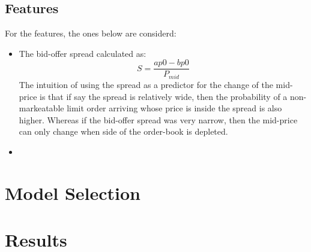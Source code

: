 \documentclass[english, 11pt, a4paper]{article}
\begin{document}
\subsection{Features}
For the features, the ones below are considerd:
\begin{itemize}
    \item The bid-offer spread calculated as:
        \begin{equation}
            S = \frac{ap0 - bp0}{P_{mid}}
        \end{equation}
    The intuition of using the spread as a predictor for the change of the mid-price is that if say
    the spread is relatively wide, then the probability of a non-markeatable limit order
    arriving whose price is inside the spread is also higher. Whereas if the bid-offer spread was very
    narrow, then the mid-price can only change when side of the order-book is depleted.
\item 
\end{itemize}



\section{Model Selection}

\section{Results}



%
\end{document}
